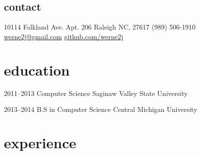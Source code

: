\documentclass[]{friggeri-cv} %
\begin{document}


\begin{aside} %
\section{contact}
10114 Falkland Ave. Apt. 206
Raleigh NC, 27617
(989) 506-1910
~
\href{mailto:werne2@gmail.com}{werne2j@gmail.com}
\href{github.com/werne2j}{github.com/werne2j}
\end{aside}


\section{education}

\begin{entrylist}

\entry
{2011--2013}
{Computer Science{\normalfont}}
{Saginaw Valley State University}

\entry
{2013--2014}
{B.S in Computer Science{\normalfont}}
{Central Michigan University}

\end{entrylist}


\section{experience}
\end{document}
